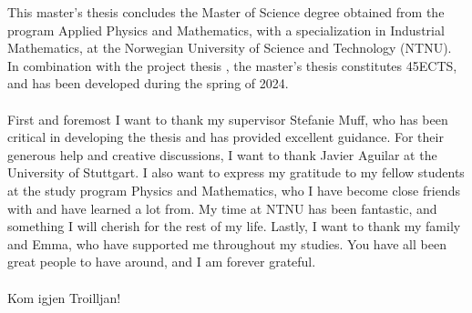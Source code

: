 This master's thesis concludes the Master of Science degree obtained from the program Applied Physics and Mathematics, with a specialization in Industrial Mathematics, at the Norwegian University of Science and Technology (NTNU). In combination with the project thesis \citep{Arnstad:Relative_variable_importance_in_Bayesian_linear_mixed_models:2024}, the master's thesis constitutes 45ECTS, and has been developed during the spring of 2024.
\\
\\
First and foremost I want to thank my supervisor Stefanie Muff, who has been critical in developing the thesis and has provided excellent guidance. For their generous help and creative discussions, I want to thank Javier Aguilar at the University of Stuttgart. I also want to express my gratitude to my fellow students at the study program Physics and Mathematics, who I have become close friends with and have learned a lot from. My time at NTNU has been fantastic, and something I will cherish for the rest of my life. Lastly, I want to thank my family and Emma, who have supported me throughout my studies. You have all been great people to have around, and I am forever grateful. 
\\
\\
Kom igjen Troilljan!